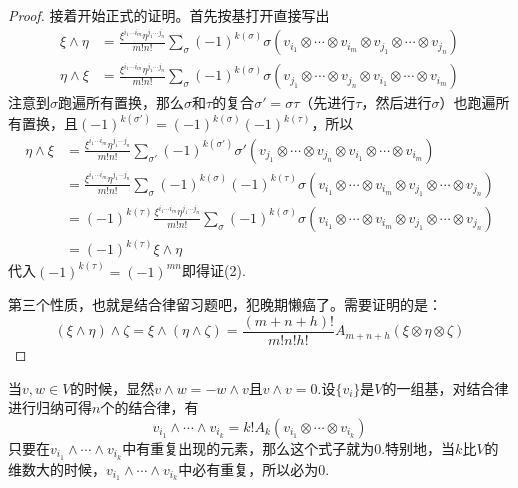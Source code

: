 \documentclass[11pt,a4paper,openany]{book}%
\theoremstyle{plain}%
\begin{document}
\begin{proof}
接着开始正式的证明。首先按基打开直接写出
\begin{equation*}
\begin{split}
\xi \wedge \eta&=\frac{\xi^{i_1\cdots i_m}\eta^{j_1 \cdots j_n}}{m!n!}\sum_{\sigma}(-1)^{k(\sigma)}\sigma(v_{i_1}\otimes \cdots \otimes v_{i_m}\otimes v_{j_1}\otimes \cdots \otimes v_{j_n})\\
\eta \wedge \xi&=\frac{\xi^{i_1\cdots i_m}\eta^{j_1 \cdots j_n}}{m!n!}\sum_{\sigma}(-1)^{k(\sigma)}\sigma(v_{j_1}\otimes \cdots \otimes v_{j_n}\otimes v_{i_1}\otimes \cdots \otimes v_{i_m})
\end{split}
\end{equation*}
注意到$\sigma$跑遍所有置换，那么$\sigma$和$\tau$的复合$\sigma'=\sigma\tau$（先进行$\tau$，然后进行$\sigma$）也跑遍所有置换，且$(-1)^{k(\sigma')}=(-1)^{k(\sigma)}(-1)^{k(\tau)}$，所以
\begin{equation*}
\begin{split}
\eta \wedge \xi&=\frac{\xi^{i_1\cdots i_m}\eta^{j_1 \cdots j_n}}{m!n!}\sum_{\sigma'}(-1)^{k(\sigma')}\sigma'(v_{j_1}\otimes \cdots \otimes v_{j_n}\otimes v_{i_1}\otimes \cdots \otimes v_{i_m})\\
&=\frac{\xi^{i_1\cdots i_m}\eta^{j_1 \cdots j_n}}{m!n!}\sum_{\sigma}(-1)^{k(\sigma)}(-1)^{k(\tau)}\sigma(v_{i_1}\otimes \cdots \otimes v_{i_m}\otimes v_{j_1}\otimes \cdots \otimes v_{j_n})\\
&=(-1)^{k(\tau)}\frac{\xi^{i_1\cdots i_m}\eta^{j_1 \cdots j_n}}{m!n!}\sum_{\sigma}(-1)^{k(\sigma)}\sigma(v_{i_1}\otimes \cdots \otimes v_{i_m}\otimes v_{j_1}\otimes \cdots \otimes v_{j_n})\\
&=(-1)^{k(\tau)} \xi \wedge \eta
\end{split}
\end{equation*}
代入$(-1)^{k(\tau)}=(-1)^{mn}$即得证(2).

第三个性质，也就是结合律留习题吧，犯晚期懒癌了。需要证明的是：
\[
(\xi \wedge \eta) \wedge \zeta=\xi \wedge (\eta \wedge \zeta)=\frac{(m+n+h)!}{m!n!h!}A_{m+n+h}(\xi \otimes \eta \otimes \zeta)
\]
\end{proof}

\indent 当$v,w\in V$的时候，显然$v \wedge w=-w \wedge v$且$v \wedge v=0$.设$\{v_i\}$是$V$的一组基，对结合律进行归纳可得$n$个的结合律，有
\[
v_{i_1} \wedge \cdots \wedge v_{i_k}=k!A_k(v_{i_1} \otimes \cdots \otimes v_{i_k})
\]
只要在$v_{i_1} \wedge \cdots \wedge v_{i_k}$中有重复出现的元素，那么这个式子就为0.特别地，当$k$比$V$的维数大的时候，$v_{i_1} \wedge \cdots \wedge v_{i_k}$中必有重复，所以必为0.
\end{document}
